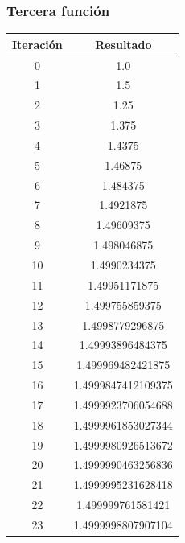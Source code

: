 \documentclass[titlepage,a4paper]{article}
\begin{document}
\subsubsection{Tercera función}\label{sec:bis3}
\begin{multicols}{2}
\begin{center}
    \begin{tabular}{| c | c |}
    \hline
     Iteración & Resultado \\ \hline
 0     &  1.0 \\
1     &  1.5 \\
2     &  1.25 \\
3     &  1.375 \\
4     &  1.4375 \\
5     &  1.46875 \\
6     &  1.484375 \\
7     &  1.4921875 \\
8     &  1.49609375 \\
9     &  1.498046875 \\
10     &  1.4990234375 \\
11     &  1.49951171875 \\
12     &  1.499755859375 \\
13     &  1.4998779296875 \\
14     &  1.49993896484375 \\
15     &  1.499969482421875 \\
16     &  1.4999847412109375 \\
17     &  1.4999923706054688 \\
18     &  1.4999961853027344 \\
19     &  1.4999980926513672 \\
20     &  1.4999990463256836 \\
21     &  1.4999995231628418 \\
22     &  1.499999761581421 \\
23     &  1.4999998807907104 \\


\end{tabular}
\end{center}
\end{multicols}
\end{document}
